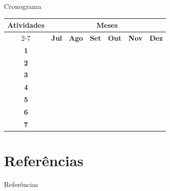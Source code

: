 \documentclass[10pt]{beamer}
\begin{document}
\begin{frame}{Cronograma}

\begin{center}
    \begin{tabular}{|c|c|c|c|c|c|c|}
    \hline
    \multirow{2}{*}{\textbf{\small{Atividades}}} &
    \multicolumn{6}{|c|}{\textbf{\small{Meses}}} \\
    \cline{2-7}
    & \textbf{Jul} & \textbf{Ago} & \textbf{Set} &
    \textbf{Out} & \textbf{Nov} & \textbf{Dez} \\
    \hline
    \textbf{\small{1}} & \cellcolor{gray} & & & & & \\
    \hline
    \textbf{\small{2}} & \cellcolor{gray} & & & & & \\
    \hline
    \textbf{\small{3}} & & \cellcolor{gray} & \cellcolor{gray} & & & \\
    \hline
    \textbf{\small{4}} & & & & \cellcolor{gray} & & \\
    \hline
    \textbf{\small{5}} & & & & \cellcolor{gray} & & \\
    \hline
    \textbf{\small{6}} & & & & & \cellcolor{gray} & \cellcolor{gray} \\
    \hline
    \textbf{\small{7}} & & & & & \cellcolor{gray} & \cellcolor{gray} \\
    \hline
    \end{tabular}
\end{center}
    
\end{frame}

\section{Referências}

\begin{frame}[allowframebreaks]{Referências}
    
    
\end{frame}
    
\end{document}
